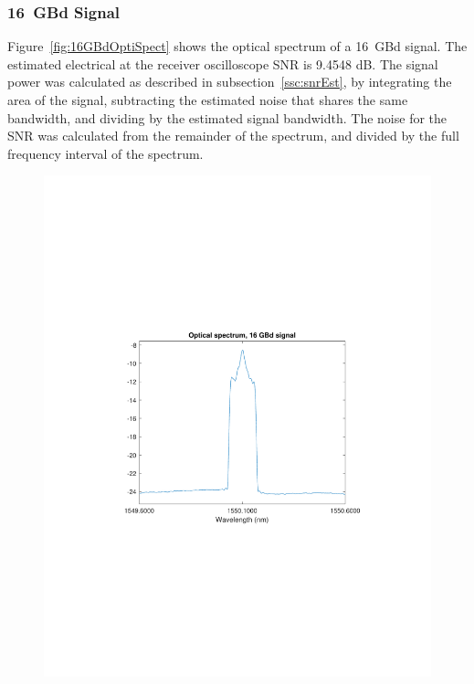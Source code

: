 \begin{refsection}
%
\subsubsection{16~GBd Signal}
%
Figure~\ref{fig:16GBdOptiSpect} shows the optical spectrum of a 16~GBd signal. The estimated electrical at the receiver oscilloscope SNR is 9.4548 dB. The signal power was calculated as described in subsection~\ref{ssc:snrEst}, by integrating the area of the signal, subtracting the estimated noise that shares the same bandwidth, and dividing by the estimated signal bandwidth. The noise for the SNR was calculated from the remainder of the spectrum, and divided by the full frequency interval of the spectrum.

\begin{figure}[H]
		\centering
	\begin{minipage}{0.43\textwidth}
	\centering
	\includegraphics[clip, trim=4cm 8cm 4cm 8cm, width=1\textwidth]{./sdf/m_qam_system/figures/expResults/16GBdOSASpectrum.pdf}

\end{minipage}
\end{figure}
\end{refsection}
